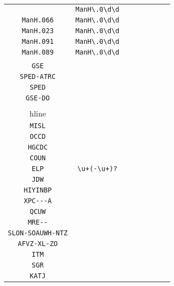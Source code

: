 \begin{longtable}{cccccccc}
\begin{tabular}{ll}
    \verb|ManH.016| & \verb|ManH\.0\d\d|\\
\verb|ManH.066| & \verb|ManH\.0\d\d|\\
\verb|ManH.023| & \verb|ManH\.0\d\d|\\
\verb|ManH.091| & \verb|ManH\.0\d\d|\\
\verb|ManH.089| & \verb|ManH\.0\d\d|
\end{tabular}
\\\midrule 
\begin{tabular}{l}
    \verb|AIUTP|\\
\verb|GSE|\\
\verb|SPED-ATRC|\\
\verb|SPED|\\
\verb|GSE-DO|\\
\\hline\\
\verb|MISL|\\
\verb|OCCD|\\
\verb|HGCDC|\\
\verb|COUN|\\
\verb|ELP|
\end{tabular}

&
\verb|\u+(-\u+)?|
&

\begin{tabular}{l}
    \verb|\u\u\u((\u)*-)*(\u)*|\\
\verb|JDW|\\
\verb|HIYINBP|\\
\verb|XPC---A|\\
\verb|QCUW|\\
\verb|MRE--|
\end{tabular}

&

\begin{tabular}{l}
    \verb|\u\u\u((\u)*-\u\u)*(\u)*|\\
\verb|SLON-SOAUWH-NTZ|\\
\verb|AFVZ-XL-ZO|\\
\verb|ITM|\\
\verb|SGR|\\
\verb|KATJ|
\end{tabular}

&


\end{longtable}
